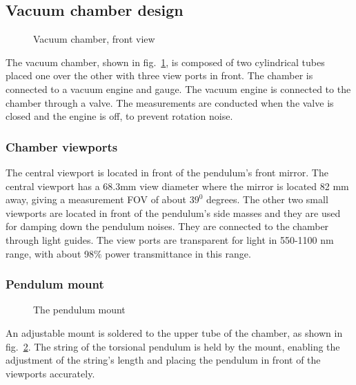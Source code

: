 \documentclass[\main/master.tex]{subfiles}
\begin{document}
\subsection{Vacuum chamber design}
\begin{figure}[htbp]
	\centering
	\caption[Vacuum chamber, front view]{Vacuum chamber, front view}
	\label{fig:chamber front}
\end{figure}
\FloatBarrier

\par\noindent
The vacuum chamber, shown in fig.~\ref{fig:chamber front}, is composed of two cylindrical tubes placed one over the other with three view ports in front. The chamber is connected to a vacuum engine and gauge. The vacuum engine is connected to the chamber through a valve. The measurements are conducted when the valve is closed and the engine is off, to prevent rotation noise.

\subsubsection{Chamber viewports}
\par\noindent
The central viewport is located in front of the pendulum's front mirror. The central viewport has a 68.3mm view diameter where the mirror is located 82 mm away, giving a measurement FOV of about $39^0$ degrees. The other two small viewports are located in front of the pendulum's side masses and they are used for damping down the pendulum noises. They are connected to the chamber through light guides. The view ports are transparent for light in 550-1100 nm range, with about 98$\%$ power transmittance in this range. 

\subsubsection{Pendulum mount}
\begin{figure}[htbp]
	\centering
	\caption[The pendulum mount]{The pendulum mount}
	\label{fig:mount}
\end{figure}
\FloatBarrier
\par\noindent
An adjustable mount is soldered to the upper tube of the chamber, as shown in fig.~\ref{fig:mount}. The string of the torsional pendulum is held by the mount, enabling the adjustment of the string's length and placing the pendulum in front of the viewports accurately. 
\end{document}
